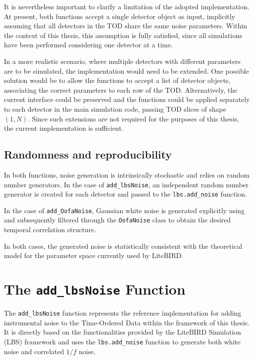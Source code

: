 It is nevertheless important to clarify a limitation of the adopted implementation. At present, both functions accept a single detector object as input, implicitly assuming that all detectors in the TOD share the same noise parameters. Within the context of this thesis, this assumption is fully satisfied, since all simulations have been performed considering one detector at a time.

In a more realistic scenario, where multiple detectors with different parameters are to be simulated, the implementation would need to be extended. One possible solution would be to allow the functions to accept a list of detector objects, associating the correct parameters to each row of the TOD. Alternatively, the current interface could be preserved and the functions could be applied separately to each detector in the main simulation code, passing TOD slices of shape $(1, N)$. Since such extensions are not required for the purposes of this thesis, the current implementation is sufficient.


\subsection{Randomness and reproducibility}

In both functions, noise generation is intrinsically stochastic and relies on random number generators. In the case of \texttt{add\_lbsNoise}, an independent random number generator is created for each detector and passed to the \texttt{lbs.add\_noise} function. 

In the case of \texttt{add\_OofaNoise}, Gaussian white noise is generated explicitly using and subsequently filtered through the \texttt{OofaNoise} class to obtain the desired temporal correlation structure.

In both cases, the generated noise is statistically consistent with the theoretical model for the parameter space currently used by LiteBIRD.





\section{The \texttt{add\_lbsNoise} Function}

The \texttt{add\_lbsNoise} function represents the reference implementation for adding instrumental noise to the Time-Ordered Data within the framework of this thesis. It is directly based on the functionalities provided by the LiteBIRD Simulation (LBS) framework and uses the \texttt{lbs.add\_noise} function to generate both white noise and correlated $1/f$ noise.

